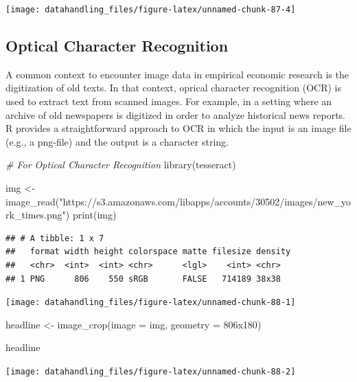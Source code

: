 \documentclass[
  12pt,
]{style/krantz}
\newenvironment{Shaded}{\begin{snugshade}}{\end{snugshade}}
\newcommand{\AttributeTok}[1]{\textcolor[rgb]{0.77,0.63,0.00}{#1}}
\newcommand{\CommentTok}[1]{\textcolor[rgb]{0.56,0.35,0.01}{\textit{#1}}}
\newcommand{\FunctionTok}[1]{\textcolor[rgb]{0.00,0.00,0.00}{#1}}
\newcommand{\NormalTok}[1]{#1}
\newcommand{\OtherTok}[1]{\textcolor[rgb]{0.56,0.35,0.01}{#1}}
\newcommand{\StringTok}[1]{\textcolor[rgb]{0.31,0.60,0.02}{#1}}
\begin{document}
\texttt{[image: datahandling\_files/figure-latex/unnamed-chunk-87-4]}

\hypertarget{optical-character-recognition}{%
\subsection{Optical Character Recognition}\label{optical-character-recognition}}

A common context to encounter image data in empirical economic research is the digitization of old texts. In that context, oprical character recognition (OCR) is used to extract text from scanned images. For example, in a setting where an archive of old newspapers is digitized in order to analyze historical news reports. R provides a straightforward approach to OCR in which the input is an image file (e.g., a png-file) and the output is a character string.

\begin{Shaded}
\begin{Highlighting}[]
\CommentTok{\# For Optical Character Recognition}
\FunctionTok{library}\NormalTok{(tesseract)}

\NormalTok{img }\OtherTok{\textless{}{-}} \FunctionTok{image\_read}\NormalTok{(}\StringTok{"https://s3.amazonaws.com/libapps/accounts/30502/images/new\_york\_times.png"}\NormalTok{)}
\FunctionTok{print}\NormalTok{(img)}
\end{Highlighting}
\end{Shaded}

\begin{verbatim}
## # A tibble: 1 x 7
##   format width height colorspace matte filesize density
##   <chr>  <int>  <int> <chr>      <lgl>    <int> <chr>  
## 1 PNG      806    550 sRGB       FALSE   714189 38x38
\end{verbatim}

\texttt{[image: datahandling\_files/figure-latex/unnamed-chunk-88-1]}

\begin{Shaded}
\begin{Highlighting}[]
\NormalTok{headline }\OtherTok{\textless{}{-}} 
  \FunctionTok{image\_crop}\NormalTok{(}\AttributeTok{image =}\NormalTok{ img, }\AttributeTok{geometry =} \StringTok{\textquotesingle{}806x180\textquotesingle{}}\NormalTok{)}

\NormalTok{headline}
\end{Highlighting}
\end{Shaded}

\texttt{[image: datahandling\_files/figure-latex/unnamed-chunk-88-2]}
\end{document}
